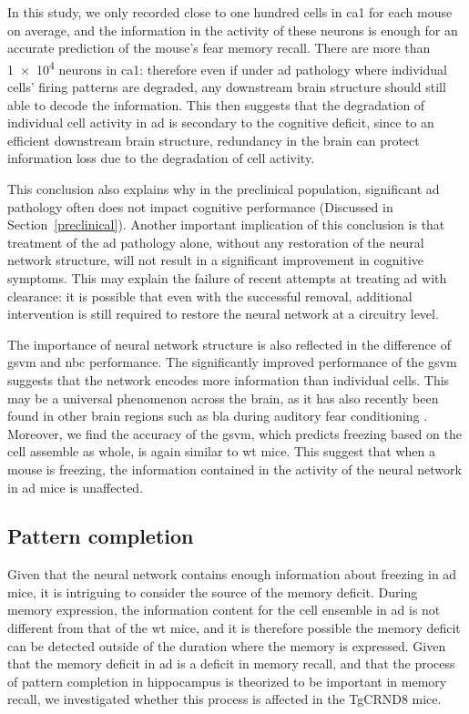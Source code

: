 In this study, we only recorded close to one hundred cells in \gls{ca1} for each mouse on average, and the information in the activity of these neurons is enough for an accurate prediction of the mouse's fear memory recall. There are more than \num{1e4} neurons in \gls{ca1}: therefore even if under \gls{ad} pathology where individual cells' firing patterns are degraded, any downstream brain structure should still able to decode the information. This then suggests that the degradation of individual cell activity in \gls{ad} is secondary to the cognitive deficit, since to an efficient downstream brain structure, redundancy in the brain can protect information loss due to the degradation of cell activity. 

This conclusion also explains why in the preclinical population, significant \gls{ad} pathology often does not impact cognitive performance (Discussed in Section~\ref{preclinical}). Another important implication of this conclusion is that treatment of the \gls{ad} pathology alone, without any restoration of the neural network structure, will not result in a significant improvement in cognitive symptoms. This may explain the failure of recent attempts at treating \gls{ad} with \abeta{} clearance: it is possible that even with the successful \abeta{} removal, additional intervention is still required to restore the neural network at a circuitry level.

The importance of neural network structure is also reflected in the difference of \gls{gsvm} and \gls{nbc} performance. The significantly improved performance of the \gls{gsvm} suggests that the network encodes more information than individual cells. This may be a universal phenomenon across the brain, as it has also recently been found in other brain regions such as \gls{bla} during auditory fear conditioning \citep{grewe17}. Moreover, we find the accuracy of the \gls{gsvm}, which predicts freezing based on the cell assemble as whole, is again similar to \gls{wt} mice. This suggest that when a mouse is freezing, the information contained in the activity of the neural network in \gls{ad} mice is unaffected. 

\subsection{Pattern completion}

Given that the neural network contains enough information about freezing in \gls{ad} mice, it is intriguing to consider the source of the memory deficit. During memory expression, the information content for the cell ensemble in \gls{ad} is not different from that of the \gls{wt} mice, and it is therefore possible the memory deficit can be detected outside of the duration where the memory is expressed. Given that the memory deficit in \gls{ad} is a deficit in memory recall, and that the process of pattern completion in hippocampus is theorized to be important in memory recall, we investigated whether this process is affected in the TgCRND8 mice.


